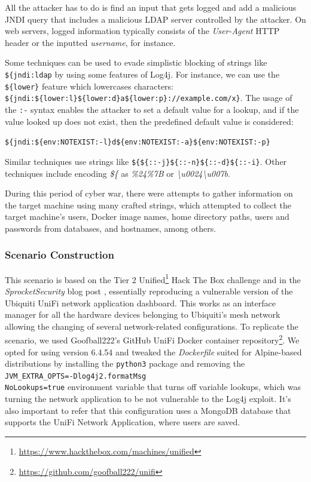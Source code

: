 All the attacker has to do is find an input that gets logged and add a malicious JNDI query that includes a malicious LDAP server controlled by the attacker. On web servers, logged information typically consists of the \textit{User-Agent} HTTP header or the inputted \textit{username}, for instance.

Some techniques can be used to evade simplistic blocking of strings like \texttt{\$\{jndi:ldap} by using some features of Log4j. For instance, we can use the \texttt{\$\{lower\}} feature which lowercases characters: \texttt{\$\{jndi:\$\{lower:l\}\$\{lower:d\}a\$\{lower:p\}://example.com/x\}}. The usage of the \texttt{:-} syntax enables the attacker to set a default value for a lookup, and if the value looked up does not exist, then the predefined default value is considered:

\texttt{\$\{jndi:\$\{env:NOTEXIST:-l\}d\$\{env:NOTEXIST:-a\}\$\{env:NOTEXIST:-p\}}


Similar techniques use strings like \texttt{\$\{\$\{::-j\}\$\{::-n\}\$\{::-d\}\$\{::-i\}}. Other techniques include encoding \textit{\$\{} as \textit{\%24\%7B} or \textit{\textbackslash u0024\textbackslash u007b}.

During this period of cyber war, there were attempts to gather information on the target machine using many crafted strings, which attempted to collect the target machine's users, Docker image names, home directory paths, users and passwords from databases, and hostnames, among others.

\subsubsection{Scenario Construction} \label{sec:validation_log4j_scenario_construction}

This scenario is based on the Tier 2 Unified\footnote{\url{https://www.hackthebox.com/machines/unified}} Hack The Box challenge and in the \textit{SprocketSecurity} blog post \cite{sprocketsecurity_ref}, essentially reproducing a vulnerable version of the Ubiquiti UniFi network application dashboard. This works as an interface manager for all the hardware devices belonging to Ubiquiti's mesh network allowing the changing of several network-related configurations. To replicate the scenario, we used Goofball222's GitHub UniFi Docker container repository\footnote{\url{https://github.com/goofball222/unifi}}. We opted for using version 6.4.54 and tweaked the \textit{Dockerfile} suited for Alpine-based distributions by installing the \texttt{python3} package
and removing the \texttt{JVM\_EXTRA\_OPTS=-Dlog4j2.formatMsg\\NoLookups=true} environment variable that turns off variable lookups, which was turning the network application to be not vulnerable to the Log4j exploit. It's also important to refer that this configuration uses a MongoDB database that supports the UniFi Network Application, where users are saved.

